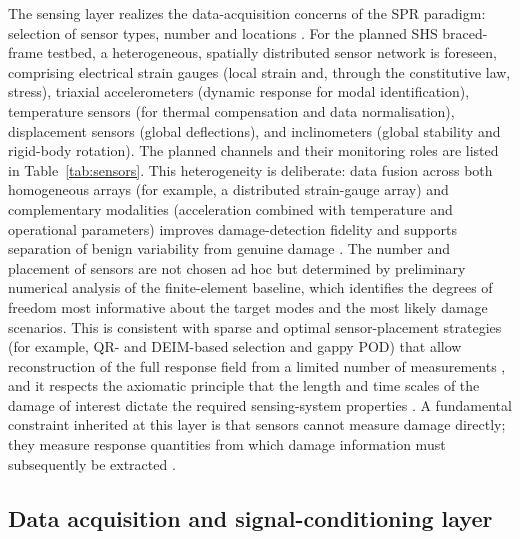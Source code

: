 The sensing layer realizes the data-acquisition concerns of the SPR paradigm: selection of sensor types, number and locations \citep{farrar2013shm}. For the planned SHS braced-frame testbed, a heterogeneous, spatially distributed sensor network is foreseen, comprising electrical strain gauges (local strain and, through the constitutive law, stress), triaxial accelerometers (dynamic response for modal identification), temperature sensors (for thermal compensation and data normalisation), displacement sensors (global deflections), and inclinometers (global stability and rigid-body rotation). The planned channels and their monitoring roles are listed in Table~\ref{tab:sensors}. This heterogeneity is deliberate: data fusion across both homogeneous arrays (for example, a distributed strain-gauge array) and complementary modalities (acceleration combined with temperature and operational parameters) improves damage-detection fidelity and supports separation of benign variability from genuine damage \citep{farrar2013shm}. The number and placement of sensors are not chosen ad hoc but determined by preliminary numerical analysis of the finite-element baseline, which identifies the degrees of freedom most informative about the target modes and the most likely damage scenarios. This is consistent with sparse and optimal sensor-placement strategies (for example, QR- and DEIM-based selection and gappy POD) that allow reconstruction of the full response field from a limited number of measurements \citep{brunton2019data,tan2020sensorplacement,hassani2023sensorplacement}, and it respects the axiomatic principle that the length and time scales of the damage of interest dictate the required sensing-system properties \citep{farrar2013shm}. A fundamental constraint inherited at this layer is that sensors cannot measure damage directly; they measure response quantities from which damage information must subsequently be extracted \citep{farrar2013shm}.

\subsection{Data acquisition and signal-conditioning layer}\label{subsec:acquisition}

